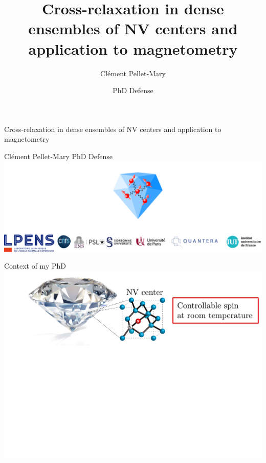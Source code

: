 \documentclass{beamer}
\title[PhD Defense]{Cross-relaxation in dense ensembles of NV centers and
application to magnetometry}
\author{Clément Pellet-Mary}
\date{PhD Defense}
\begin{document}

\begin{frame}
\centering
\begin{tcolorbox}[colback=blue!20!white]
\centering
\Large
Cross-relaxation in dense ensembles of NV centers and
application to magnetometry
\end{tcolorbox}
\bigskip
Clément Pellet-Mary PhD Defense
\bigskip
\includegraphics[width=\textwidth,height=0.5\textheight,keepaspectratio]{logos}
\end{frame}

\begin{frame}{Context of my PhD}
\centering
\includegraphics[width=\textwidth,height=0.85\textheight,keepaspectratio]{Slide_contexte_f-4}
\end{frame}
\end{document}
